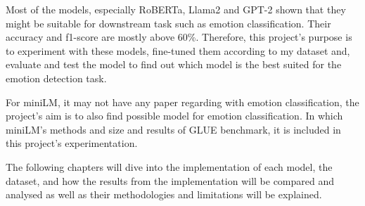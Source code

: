  Most of the models, especially RoBERTa, Llama2 and GPT-2 shown that they might be suitable for downstream task such as emotion classification. Their accuracy and f1-score are mostly above 60\%. Therefore, this project's purpose is to experiment with these models, fine-tuned them according to my dataset and, evaluate and test the model to find out which model is the best suited for the emotion detection task.

 For miniLM, it may not have any paper regarding with emotion classification, the project's aim is to also find possible model for emotion classification. In which miniLM's methods and size and results of GLUE benchmark, it is included in this project's experimentation.
 
The following chapters will dive into the implementation of each model, the dataset, and how the results from the implementation will be compared and analysed as well as their methodologies and limitations will be explained.